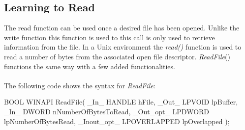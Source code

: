 \documentclass[a4paper]{article}
\begin{document}
\subsection{Learning to Read}
The read function can be used once a desired file has been opened. Unlike the write function this function is used to this call is only used to retrieve information from the file. In a Unix environment the \textit{read()} function is used to read a number of bytes from the associated open file descriptor. \textit{ReadFile}() functions the same way with a few added functionalities. \\
\\
The following code shows the syntax for \textit{ReadFile}:\\
\begin{code}

BOOL WINAPI ReadFile(
  	_In_         HANDLE hFile,
  	_Out_        LPVOID lpBuffer,
  	_In_         DWORD nNumberOfBytesToRead,
  	_Out_opt_    LPDWORD lpNumberOfBytesRead,
  	_Inout_opt_  LPOVERLAPPED lpOverlapped
);

\end{code}\\
\end{document}
